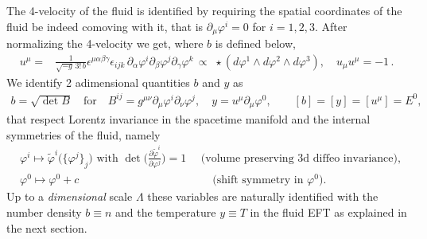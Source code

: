 The 4-velocity of the fluid is identified by requiring the spatial coordinates of the fluid be indeed comoving with it, that is $\partial_\mu \varphi^i=0$ for $i=1,2,3$.
After normalizing the 4-velocity we get, where $b$ is defined below,
\begin{align}\label{eq:definition_4_velocity}
    u^\mu=& \frac{1}{\sqrt{-g}\, 3!\,b} \epsilon^{\mu \alpha \beta \gamma} \epsilon_{ijk} \, \partial_\alpha \varphi^i \partial_\beta \varphi^j \partial_\gamma \varphi^k\, \propto\,\,  \star(d\varphi^1\wedge d\varphi^2\wedge d \varphi^3), \quad u_\mu u^\mu=-1\,.
\end{align}
We identify 2 adimensional quantities $b$ and $y$ as
\begin{align}\label{eq:definition_b_y}
    b=\sqrt{\det B}\quad \text{for}\quad
    B^{ij}= g^{\mu\nu} \partial_\mu \varphi^i \partial_\nu \varphi^j,\quad y= u^\mu \partial_\mu \varphi^0, \qquad [b]=[y]=[u^\mu]=E^0,
\end{align}
that respect Lorentz invariance in the spacetime manifold and the internal symmetries of the fluid, namely 
{\small\begin{align}\label{eq:symmetries_fluid_internal}
    &\varphi^i \mapsto \tilde{\varphi}^i\big(\{\varphi^j\}_j\big)\,\,\text{with}\,\, \det\Big(\frac{\partial \tilde{\varphi}^i}{\partial\varphi^j}\Big)=1\,\,\quad \text{(volume preserving 3d diffeo invariance)},\\
    &\varphi^0 \mapsto \varphi^0 + c\quad\qquad\quad\qquad\qquad\qquad\qquad \text{(shift symmetry in $\varphi^0$)}.
\end{align}}
Up to a \emph{dimensional} scale $\Lambda$ these variables are naturally identified with the number density $b\equiv n$ and the temperature $y\equiv T$ in the fluid EFT as explained in the next section.


